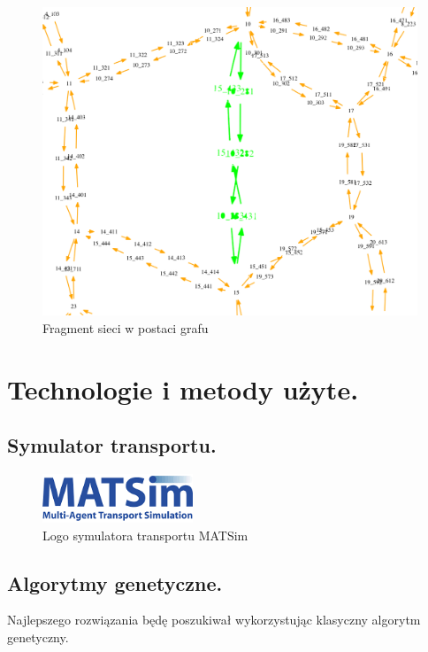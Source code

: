 \documentclass[twoside,12pt]{report}
\let\oldsection\chapter
\def\chapter{\cleardoublepage\oldsection}
\begin{document}
\begin{figure}[ht]
\includegraphics[width=\textwidth]{img/bool-efect}
\caption{Fragment sieci w postaci grafu}
\end{figure}


\chapter{Technologie i metody użyte.}\label{rozdz.technologie} 
\section{Symulator transportu.}


\begin{figure}[ht]
\includegraphics[width=0.40\textwidth]{img/matsim}
\caption{Logo symulatora transportu MATSim \cite{matsim}} 
\end{figure}





\section{Algorytmy genetyczne.}

Najlepszego rozwiązania będę poszukiwał wykorzystując klasyczny algorytm genetyczny.
\end{document}
